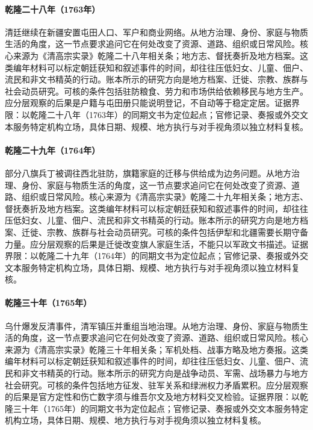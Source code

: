 \hypertarget{social:EQ-1763-XINJIANG-SETTLEMENT}{}\paragraph{乾隆二十八年（1763年）}清廷继续在新疆安置屯田人口、军户和商业网络。从地方治理、身份、家庭与物质生活的角度，这一节点要求追问它在何处改变了资源、道路、组织或日常风险。核心来源为《清高宗实录》乾隆二十八年相关条；地方志、督抚奏折及地方档案。这类编年材料可以标定朝廷获知和叙述事件的时间，却往往压低妇女、儿童、佃户、流民和非文书精英的行动。账本所示的研究方向是地方档案、迁徙、宗教、族群与社会动员研究。可核的条件包括驻防粮食、劳力和市场供给依赖移民与地方生产。应分层观察的后果是户籍与屯田册只能说明登记，不自动等于稳定定居。证据界限：以乾隆二十八年（1763年）的同期文书为定位起点；官修记录、奏报或外交文本服务特定机构立场，具体日期、规模、地方执行与对手视角须以独立材料复核。
\hypertarget{social:EQ-1764-MANCHU-BANNER-RESETTLEMENT}{}\paragraph{乾隆二十九年（1764年）}部分八旗兵丁被调往西北驻防，旗籍家庭的迁移与供给成为边务问题。从地方治理、身份、家庭与物质生活的角度，这一节点要求追问它在何处改变了资源、道路、组织或日常风险。核心来源为《清高宗实录》乾隆二十九年相关条；地方志、督抚奏折及地方档案。这类编年材料可以标定朝廷获知和叙述事件的时间，却往往压低妇女、儿童、佃户、流民和非文书精英的行动。账本所示的研究方向是地方档案、迁徙、宗教、族群与社会动员研究。可核的条件包括伊犁和北疆需要长期守备力量。应分层观察的后果是迁徙改变旗人家庭生活，不能只以军政文书描述。证据界限：以乾隆二十九年（1764年）的同期文书为定位起点；官修记录、奏报或外交文本服务特定机构立场，具体日期、规模、地方执行与对手视角须以独立材料复核。
\hypertarget{social:EQ-1765-USH-REBELLION}{}\paragraph{乾隆三十年（1765年）}乌什爆发反清事件，清军镇压并重组当地治理。从地方治理、身份、家庭与物质生活的角度，这一节点要求追问它在何处改变了资源、道路、组织或日常风险。核心来源为《清高宗实录》乾隆三十年相关条；军机处档、战事方略及地方奏报。这类编年材料可以标定朝廷获知和叙述事件的时间，却往往压低妇女、儿童、佃户、流民和非文书精英的行动。账本所示的研究方向是战争动员、军需、战场暴力与地方社会研究。可核的条件包括地方征发、驻军关系和绿洲权力矛盾累积。应分层观察的后果是官方定性和伤亡数字须与维吾尔文及地方材料交叉检验。证据界限：以乾隆三十年（1765年）的同期文书为定位起点；官修记录、奏报或外交文本服务特定机构立场，具体日期、规模、地方执行与对手视角须以独立材料复核。
